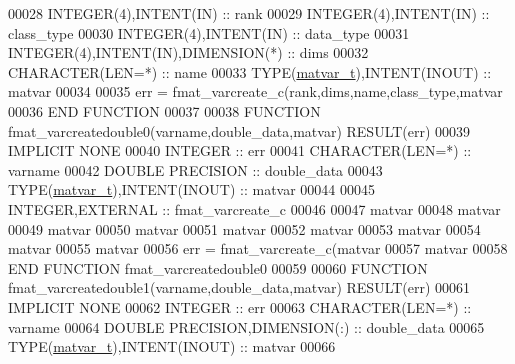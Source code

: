 \begin{DoxyCode}
00028     \textcolor{keywordtype}{INTEGER(4)},\textcolor{keywordtype}{INTENT(IN)}              :: rank
00029     \textcolor{keywordtype}{INTEGER(4)},\textcolor{keywordtype}{INTENT(IN)}              :: class\_type
00030     \textcolor{keywordtype}{INTEGER(4)},\textcolor{keywordtype}{INTENT(IN)}              :: data\_type
00031     \textcolor{keywordtype}{INTEGER(4)},\textcolor{keywordtype}{INTENT(IN)},\textcolor{keywordtype}{DIMENSION(*)} :: dims
00032     \textcolor{keywordtype}{CHARACTER(LEN=*)} :: name
00033     \textcolor{keywordtype}{TYPE}(\hyperlink{group___m_a_t_structmatvar__t}{matvar\_t}),\textcolor{keywordtype}{INTENT(INOUT)}        :: matvar
00034 
00035     err = fmat\_varcreate\_c(rank,dims,name,class\_type,matvar%
00036 \textcolor{keyword}{END FUNCTION}
00037 
00038 \textcolor{keyword}{FUNCTION }fmat\_varcreatedouble0(varname,double\_data,matvar) \textcolor{keyword}{RESULT}(err)
00039 \textcolor{keywordtype}{IMPLICIT NONE}
00040     \textcolor{keywordtype}{INTEGER}                         :: err
00041     \textcolor{keywordtype}{CHARACTER(LEN=*)}                :: varname
00042     \textcolor{keywordtype}{DOUBLE PRECISION}                :: double\_data
00043     \textcolor{keywordtype}{TYPE}(\hyperlink{group___m_a_t_structmatvar__t}{matvar\_t}),\textcolor{keywordtype}{INTENT(INOUT)}    :: matvar
00044 
00045     \textcolor{keywordtype}{INTEGER},\textcolor{keywordtype}{EXTERNAL}                :: fmat\_varcreate\_c
00046 
00047     matvar%
00048     matvar%
00049     matvar%
00050     matvar%
00051     matvar%
00052     matvar%
00053     matvar%
00054     matvar%
00055     matvar%
00056     err = fmat\_varcreate\_c(matvar%
00057                            matvar%
00058 \textcolor{keyword}{END FUNCTION }fmat\_varcreatedouble0
00059 
00060 \textcolor{keyword}{FUNCTION }fmat\_varcreatedouble1(varname,double\_data,matvar) \textcolor{keyword}{RESULT}(err)
00061 \textcolor{keywordtype}{IMPLICIT NONE}
00062     \textcolor{keywordtype}{INTEGER}                         :: err
00063     \textcolor{keywordtype}{CHARACTER(LEN=*)}                :: varname
00064     \textcolor{keywordtype}{DOUBLE PRECISION},\textcolor{keywordtype}{DIMENSION(:)}   :: double\_data
00065     \textcolor{keywordtype}{TYPE}(\hyperlink{group___m_a_t_structmatvar__t}{matvar\_t}),\textcolor{keywordtype}{INTENT(INOUT)}    :: matvar
00066 

\end{DoxyCode}
